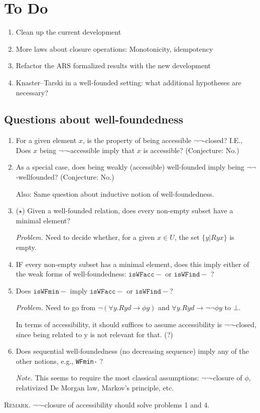 \documentclass{scrartcl}
\begin{document}
\section{To Do}
\begin{enumerate}
  \item Clean up the current development
  \item More laws about closure operations: Monotonicity, idempotency
  \item Refactor the ARS formalized results with the new development
  \item Knaster--Tarski in a well-founded setting: what additional
  hypotheses are necessary?
\end{enumerate}

\subsection{Questions about well-foundedness}

\begin{enumerate}
  \item For a given element $x$, is the property of
  being accessible $\lnot\lnot$-closed? I.E.,
  Does $x$ being $\lnot\lnot$-accessible imply that $x$ is accessible?
  (Conjecture: No.)

  \item As a special case, does being weakly (accessible) well-founded imply being $\lnot\lnot$-wellfounded?
  (Conjecture: No.)

  Also: Same question about inductive notion of well-foundedness.

  \item ($\star$) Given a well-founded relation, does every non-empty subset
  have a minimal element?

  \emph{Problem.} Need to decide whether, for a given $x \in U$,
   the set $\{y | Ryx\}$ is empty.

   \item IF every non-empty subset has a minimal element, does this imply
   either of the weak forms of well-foundedness: $\mathtt{isWFacc-}$ or
   $\mathtt{isWFind-}$ ?

   \item Does $\mathtt{isWFmin-}$ imply $\mathtt{isWFacc-}$ or $\mathtt{isWFind-}$?

   \emph{Problem.} Need to go from $\lnot (\forall y. R y d \to \phi y)$
   and $\forall y. R y d \to \lnot \lnot \phi y$ to $\bot$.

   In terms of accessibility, it should suffices to assume accessibility is
   $\lnot\lnot$-closed, since being related to y is not relevant for that. (?)

   \item Does sequential well-foundedness (no decreasing sequence) imply
   any of the other notions, e.g., \texttt{WFmin-} ?

   \emph{Note.}  This seems to require the most classical assumptions:
   $\lnot\lnot$-closure of $\phi$, relativized De Morgan law,
   Markov's principle, etc.
\end{enumerate}

\textsc{Remark.}
$\lnot\lnot$-closure of accessibility should solve problems 1 and 4.
\end{document}
